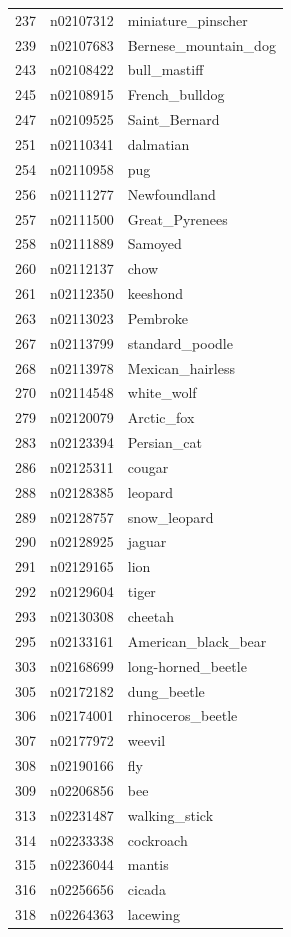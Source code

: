 \begin{table}
\begin{tabular}{cll}
237 & n02107312 & miniature_pinscher \\
239 & n02107683 & Bernese_mountain_dog \\
243 & n02108422 & bull_mastiff \\
245 & n02108915 & French_bulldog \\
247 & n02109525 & Saint_Bernard \\
251 & n02110341 & dalmatian \\
254 & n02110958 & pug \\
256 & n02111277 & Newfoundland \\
257 & n02111500 & Great_Pyrenees \\
258 & n02111889 & Samoyed \\
260 & n02112137 & chow \\
261 & n02112350 & keeshond \\
263 & n02113023 & Pembroke \\
267 & n02113799 & standard_poodle \\
268 & n02113978 & Mexican_hairless \\
270 & n02114548 & white_wolf \\
279 & n02120079 & Arctic_fox \\
283 & n02123394 & Persian_cat \\
286 & n02125311 & cougar \\
288 & n02128385 & leopard \\
289 & n02128757 & snow_leopard \\
290 & n02128925 & jaguar \\
291 & n02129165 & lion \\
292 & n02129604 & tiger \\
293 & n02130308 & cheetah \\
295 & n02133161 & American_black_bear \\
303 & n02168699 & long-horned_beetle \\
305 & n02172182 & dung_beetle \\
306 & n02174001 & rhinoceros_beetle \\
307 & n02177972 & weevil \\
308 & n02190166 & fly \\
309 & n02206856 & bee \\
313 & n02231487 & walking_stick \\
314 & n02233338 & cockroach \\
315 & n02236044 & mantis \\
316 & n02256656 & cicada \\
318 & n02264363 & lacewing \\

\end{tabular}
\end{table}
